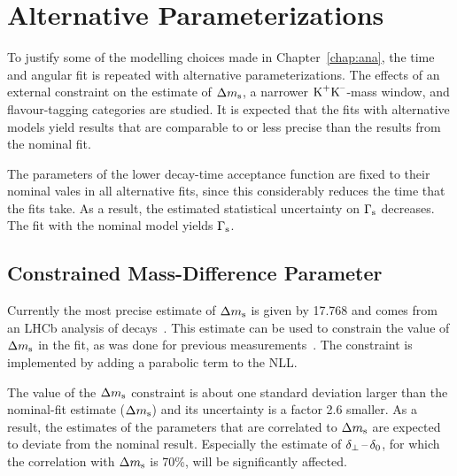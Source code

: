 \section{Alternative Parameterizations}
\label{sec:result_altParam}

To justify some of the modelling choices made in Chapter~\ref{chap:ana}, the time and angular fit is repeated with alternative
parameterizations. The effects of an external constraint on the estimate of $\Delta m_\text{s}$, a narrower $\text{K}^\text{+}\text{K}^\text{--}$-mass window, and flavour-tagging
categories are studied. It is expected that the fits with alternative models yield results that are comparable to or less precise than the
results from the nominal fit.

The parameters of the lower decay-time acceptance function are fixed to their nominal vales in all alternative fits, since this
considerably reduces the time that the fits take. As a result, the estimated statistical uncertainty on $\Gamma_\text{s}$ decreases. The fit with the
nominal model yields $\Gamma_\text{s}$\unitsp\invps.


\subsection{Constrained Mass-Difference Parameter}
\label{subsec:result_altParam_Delm}

Currently the most precise estimate of $\Delta m_\text{s}$ is given by 17.768\unitsp\invps{} and comes from an LHCb analysis of
\BstoDsmpip{} decays~\cite{LHCb-PAPER-2013-006}. This estimate can be used to constrain the value of $\Delta m_\text{s}$ in the \BstoJpsiKK{} fit, as
was done for previous measurements~\cite{LHCb-PAPER-2011-021,*LHCb-ANA-2011-036,LHCb-PAPER-2013-002,*LHCb-ANA-2012-067}. The constraint is
implemented by adding a parabolic term to the NLL.

The value of the $\Delta m_\text{s}$ constraint is about one standard deviation larger than the nominal-fit estimate
($\Delta m_\text{s}$\unitsp\invps) and its uncertainty is a factor 2.6 smaller. As a result, the estimates of the parameters
that are correlated to $\Delta m_\text{s}$ are expected to deviate from the nominal result. Especially the estimate of $\delta_{\perp}\,\text{--}\,\delta_{0}$, for which the
correlation with $\Delta m_\text{s}$ is 70\%, will be significantly affected.


